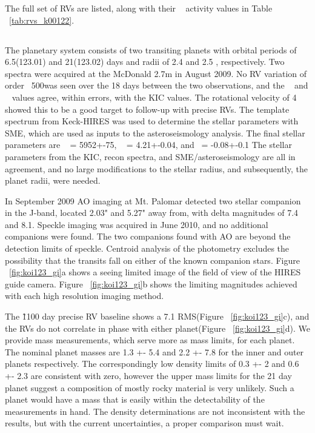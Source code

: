 \documentclass{emulateapj}
\begin{document}
The full set of RVs are listed, along with their \rphk~ activity values in Table ~\ref{tab:rvs_k00122}.



\subsection{\koionetwothree} %

The {\koionetwothree} planetary system consists of two transiting planets with orbital periods of 6.5(123.01) and 21(123.02) days and radii of 2.4 and 2.5 \rearthe, respectively. Two spectra were acquired at the McDonald 2.7m in August 2009.  No RV variation of order ~500\ms was seen over the 18 days between the two observations, and the \teff~ and \logg~ values agree, within errors, with the KIC values. The rotational velocity of 4 \kms showed this to be a good target to follow-up with precise RVs. The template spectrum from Keck-HIRES was used to determine the stellar parameters with SME, which are used as inputs to the asteroseismology analysis. The final stellar parameters are \teff~ = 5952+-75, \logg~ = 4.21+-0.04, and \feh~= -0.08+-0.1 The stellar parameters from the KIC, recon spectra, and SME/asteroseismology are all in agreement, and no large modifications to the stellar radius, and subsequently, the planet radii, were needed.

In September 2009 AO imaging at Mt. Palomar detected two stellar companion in the J-band, located 2.03" and 5.27" away from, with delta magnitudes of 7.4 and 8.1. Speckle imaging was acquired in June 2010, and no additional companions were found. The two companions found with AO are beyond the detection limits of speckle. Centroid analysis of the \ek photometry  excludes the possibility that the transits fall on either of the known companion stars. Figure ~\ref{fig:koi123_gi}a shows a seeing limited
 image of the field of view of the HIRES guide camera.  Figure ~\ref{fig:koi123_gi}b shows the limiting magnitudes achieved with each high resolution imaging method.  

The \~1100 day precise RV baseline shows a 7.1 \ms RMS(Figure ~\ref{fig:koi123_gi}c), and the RVs do not correlate in phase with either planet(Figure ~\ref{fig:koi123_gi}d). We provide mass measurements, which serve more as mass limits, for each planet. The nominal planet masses are 1.3 +- 5.4 \mearth and 2.2 +- 7.8 \mearth for the inner and outer planets respectively. The correspondingly low density limits of 0.3 +- 2 \gcc and 0.6 +- 2.3 \gcc are consistent with zero, however the upper mass limits for the 21 day planet suggest  a composition of mostly rocky material is very unlikely. Such a planet would have a mass that is easily within the detectability of the  measurements in hand. The density determinations are not inconsistent with the \cite{Lopez2012} results, but with the current uncertainties, a proper comparison must wait.
\end{document}
